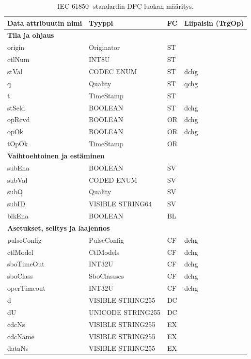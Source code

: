 \begin{table}[ht!]
	\caption{IEC 61850 -standardin DPC-luokan määritys.}
	\label{tab:iec61850-DPC-class-definition}
	\begin{tabular}{l | l | l | l}
		\hline
		\textbf{Data attribuutin nimi} & \textbf{Tyyppi} & \textbf{FC} & \textbf{Liipaisin (TrgOp)} \\
		\hline
		\multicolumn{4}{l}{\textbf{Tila ja ohjaus}} \\
		\hline
		origin & Originator & ST &  \\
		ctlNum & INT8U & ST &  \\
		stVal & CODEC ENUM & ST & dchg \\
		q & Quality & ST & qchg \\
		t & TimeStamp & ST &  \\
		stSeld & BOOLEAN & ST & dchg \\
		opRcvd & BOOLEAN & OR & dchg \\
		opOk & BOOLEAN & OR & dchg \\
		tOpOk & TimeStamp & OR &  \\
		\hline
		\multicolumn{4}{l}{\textbf{Vaihtoehtoinen ja estäminen}} \\
		\hline
		subEna & BOOLEAN & SV &  \\
		subVal & CODED ENUM & SV &  \\
		subQ & Quality & SV &  \\
		subID & VISIBLE STRING64 & SV &  \\
		blkEna & BOOLEAN & BL &  \\
		\hline
		\multicolumn{4}{l}{\textbf{Asetukset, selitys ja laajennos}} \\
		\hline
		pulseConfig & PulseConfig & CF & dchg \\
		ctlModel & CtlModels & CF & dchg \\
		sboTimeOut & INT32U & CF & dchg \\
		sboClass & SboClassses & CF & dchg \\
		operTimeout & INT32U & CF & dchg \\
		d & VISIBLE STRING255 & DC &  \\
		dU & UNICODE STRING255 & DC &  \\
		cdcNs & VISIBLE STRING255 & EX &  \\
		cdcName & VISIBLE STRING255 & EX &  \\
		dataNs & VISIBLE STRING255 & EX &  \\
		\hline
	\end{tabular}
\end{table}

